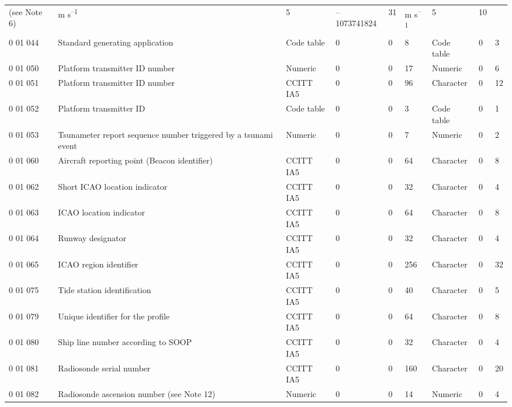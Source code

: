 \begin{longtable}[]{@{}lllllllll@{}}
\begin{minipage}[t]{0.08\columnwidth}
(see Note 6)\strut
\end{minipage} & \begin{minipage}[t]{0.08\columnwidth}\raggedright
m s\textsuperscript{--1}\strut
\end{minipage} & \begin{minipage}[t]{0.08\columnwidth}\raggedright
5\strut
\end{minipage} & \begin{minipage}[t]{0.08\columnwidth}\raggedright
--1073741824\strut
\end{minipage} & \begin{minipage}[t]{0.08\columnwidth}\raggedright
31\strut
\end{minipage} & \begin{minipage}[t]{0.08\columnwidth}\raggedright
m s\textsuperscript{--1}\strut
\end{minipage} & \begin{minipage}[t]{0.08\columnwidth}\raggedright
5\strut
\end{minipage} & \begin{minipage}[t]{0.08\columnwidth}\raggedright
10\strut
\end{minipage}\tabularnewline
0 01 044 & Standard generating application & Code table & 0 & 0 & 8 & Code table & 0 & 3\tabularnewline
0 01 050 & Platform transmitter ID number & Numeric & 0 & 0 & 17 & Numeric & 0 & 6\tabularnewline
0 01 051 & Platform transmitter ID number & CCITT IA5 & 0 & 0 & 96 & Character & 0 & 12\tabularnewline
0 01 052 & Platform transmitter ID & Code table & 0 & 0 & 3 & Code table & 0 & 1\tabularnewline
0 01 053 & Tsunameter report sequence number triggered by a tsunami event & Numeric & 0 & 0 & 7 & Numeric & 0 & 2\tabularnewline
0 01 060 & Aircraft reporting point (Beacon identifier) & CCITT IA5 & 0 & 0 & 64 & Character & 0 & 8\tabularnewline
0 01 062 & Short ICAO location indicator & CCITT IA5 & 0 & 0 & 32 & Character & 0 & 4\tabularnewline
0 01 063 & ICAO location indicator & CCITT IA5 & 0 & 0 & 64 & Character & 0 & 8\tabularnewline
0 01 064 & Runway designator & CCITT IA5 & 0 & 0 & 32 & Character & 0 & 4\tabularnewline
0 01 065 & ICAO region identifier & CCITT IA5 & 0 & 0 & 256 & Character & 0 & 32\tabularnewline
0 01 075 & Tide station identification & CCITT IA5 & 0 & 0 & 40 & Character & 0 & 5\tabularnewline
0 01 079 & Unique identifier for the profile & CCITT IA5 & 0 & 0 & 64 & Character & 0 & 8\tabularnewline
0 01 080 & Ship line number according to SOOP & CCITT IA5 & 0 & 0 & 32 & Character & 0 & 4\tabularnewline
0 01 081 & Radiosonde serial number & CCITT IA5 & 0 & 0 & 160 & Character & 0 & 20\tabularnewline
0 01 082 & Radiosonde ascension number (see Note 12) & Numeric & 0 & 0 & 14 & Numeric & 0 & 4\tabularnewline
\bottomrule
\end{longtable}

